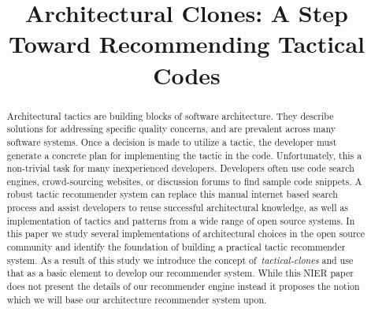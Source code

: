 \documentclass[conference]{IEEEtran}
\begin{document}
%
\title{Architectural Clones: A Step Toward Recommending Tactical Codes}

\author{
}








\maketitle


\begin{abstract}

Architectural tactics are building blocks of software architecture. They describe solutions for addressing specific quality concerns, and are prevalent across many software systems. Once a decision is made to utilize a tactic, the developer must generate a concrete plan for implementing the tactic in the code. Unfortunately, this a non-trivial task for many inexperienced developers. Developers often use code search engines, crowd-sourcing websites, or discussion forums to find sample code snippets. A robust tactic recommender system can replace this manual internet based search process and assist developers to reuse successful architectural knowledge, as well as implementation of tactics and patterns  from a wide range of open source systems. In this paper we study several implementations of architectural choices in the open source community and identify the foundation of building a practical tactic recommender system. As a result of this study we introduce the concept of~\emph{tactical-clones} and use that as a basic element to develop our recommender system. While this NIER paper does not present the details of our recommender engine instead it proposes the notion which we will base our architecture recommender system upon.

\end{abstract}
\end{document}
